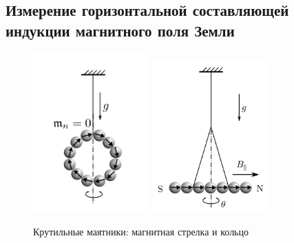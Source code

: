 \documentclass[12pt,a4paper]{article}
\begin{document}
\newpage
\subsection{Измерение горизонтальной составляющей индукции магнитного
поля Земли}
  \begin{figure}[H]
    \includegraphics*[width=0.4\textwidth]{03_23_12.png}
    \includegraphics*[width=0.4\textwidth]{2023-10-02-17-27-25.png}
    \caption{Крутильные маятники: магнитная стрелка и кольцо}
  \end{figure}
\end{document}
